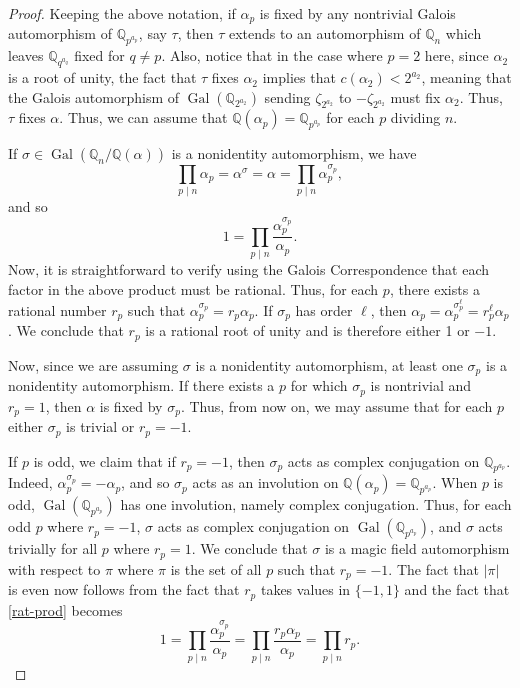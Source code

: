 \documentclass[12pt]{amsart}
\theoremstyle{definition}
\newcommand{\Q}{\mathbb{Q}}
\DeclareMathOperator{\Gal}{Gal}
\begin{document}
\begin{proof}
	Keeping the above notation, if $\alpha_p$ is fixed by any nontrivial Galois automorphism of $\Q_{p^{a_p}}$, say $\tau$, then $\tau$ extends to an automorphism of $\Q_n$ which leaves $\Q_{q^{a_q}}$ fixed for $q \neq p$. Also, notice that in the case where $p = 2$ here, since $\alpha_2$ is a root of unity, the fact that $\tau$ fixes $\alpha_2$ implies that $c(\alpha_2) < 2^{a_2}$, meaning that the Galois automorphism of $\Gal(\Q_{2^{a_2}})$ sending $\zeta_{2^{a_2}}$ to $-
	\zeta_{2^{a_2}}$ must fix $\alpha_2$. Thus, $\tau$ fixes $\alpha$. Thus, we can assume that $\Q(\alpha_p) = \Q_{p^{a_p}}$ for each $p$ dividing $n$. 
	
	If $\sigma \in \Gal(\Q_n/\Q(\alpha))$ is a nonidentity automorphism, we have
	$$
	\prod_{p \mid n} \alpha_p = \alpha^\sigma =  \alpha = \prod_{p\mid n} \alpha_p^{\sigma_p} ,
	$$
	and so
	\begin{equation}\label{rat-prod}  
	1 = \prod_{p \mid n} \dfrac{\alpha_p^{\sigma_p}}{\alpha_p}.
	\end{equation} 
	Now, it is straightforward to verify using the
Galois Correspondence that each factor in the above
 product must be rational. Thus, for each $p$,
  there exists a rational number $r_p$ such that $\alpha_p^{\sigma_p} = r_p\alpha_p$.  If
   $\sigma_p$ has order $\ell$, then $\alpha_p = \alpha_p^{\sigma_p^\ell} = r_p^\ell\alpha_p$. We conclude that $r_p$ is a rational
  root of unity and is therefore either 1 or $-1$. 
  
  Now, since we are assuming $\sigma$ is a nonidentity automorphism, at least one $\sigma_p$ is a nonidentity automorphism. If there exists a $p$ for which $\sigma_p$ is nontrivial and $r_p = 1$, then $\alpha$ is fixed by $\sigma_p$. Thus, from now on, we may assume that for each $p$ either $\sigma_p$ is trivial or $r_p = -1$. 
  
 If $p$ is odd, we claim that if $r_p = -1$, then $\sigma_p$ acts as complex conjugation on $\Q_{p^{a_p}}$. Indeed, $\alpha_p^{\sigma_p} = -\alpha_p$, and so $\sigma_p$ acts as an involution on $\Q(\alpha_p) = \Q_{p^{a_p}}$. When $p$ is odd, $\Gal(\Q_{p^{a_p}})$ has one involution, namely complex conjugation. Thus, for each odd $p$ where $r_p = -1$, $\sigma$ acts as complex conjugation on $\Gal(\Q_{p^{a_p}})$, and $\sigma$ acts trivially for all $p$ where $r_p = 1$. We conclude that $\sigma$ is a magic field automorphism with respect to $\pi$ where $\pi$ is the set of all $p$ such that $r_p = -1$. The fact that $|\pi|$ is even now follows from the fact that $r_p$ takes values in $\{-1,1\}$ and the fact that \eqref{rat-prod} becomes
 $$
 1 = \prod_{p \mid n} \dfrac{\alpha_p^{\sigma_p}}{\alpha_p} =  \prod_{p \mid n} \dfrac{r_p\alpha_p}{\alpha_p} = \prod_{p \mid n} r_p.
 $$
\end{proof} 
\end{document}
